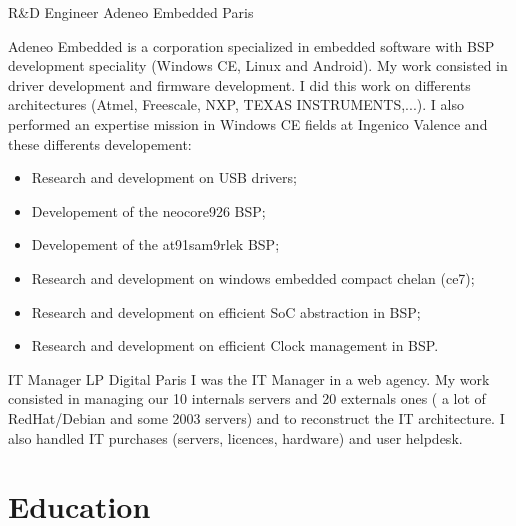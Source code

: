 \documentclass[11pt,a4paper,sans]{moderncv}
\begin{document}
{R\&D Engineer}
{Adeneo Embedded}
{Paris}
{}
{Adeneo Embedded is a corporation specialized in embedded software with BSP
development speciality (Windows CE, Linux and Android).
My work consisted in driver development and firmware development. 
I did this work on differents architectures (Atmel, Freescale,
NXP, TEXAS INSTRUMENTS,...).
I also performed an expertise mission in Windows CE fields at Ingenico
Valence and these differents developement:
\begin{itemize}
\item Research and development on USB drivers;
\item Developement of the neocore926 BSP;
\item Developement of the at91sam9rlek BSP;
\item Research and development on windows embedded compact chelan (ce7);
\item Research and development on efficient SoC abstraction in BSP;
\item Research and development on efficient Clock management in BSP.
\end{itemize}
}

{IT Manager}
{LP Digital}
{Paris}
{}
{I was the IT Manager in a web agency.\newline{}
My work consisted in managing our 10 internals servers and 20 externals ones
( a lot of RedHat/Debian and some 2003 servers) and to reconstruct the IT
architecture.
I also handled IT purchases (servers, licences, hardware) and user helpdesk.
}

\section{Education}
\end{document}
